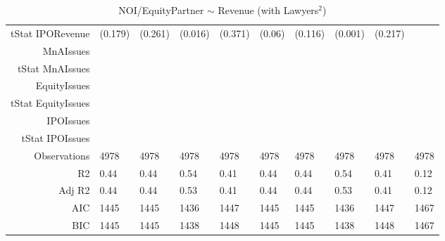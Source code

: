 \begin{table}[ht]
\begin{tabular}{rlllllllll}
  tStat IPORevenue & (0.179) & (0.261) & (0.016) & (0.371) & (0.06) & (0.116) & (0.001) & (0.217) &  \\ 
  MnAIssues &  &  &  &  &  &  &  &  &  \\ 
  tStat MnAIssues &  &  &  &  &  &  &  &  &  \\ 
  EquityIssues &  &  &  &  &  &  &  &  &  \\ 
  tStat EquityIssues &  &  &  &  &  &  &  &  &  \\ 
  IPOIssues &  &  &  &  &  &  &  &  &  \\ 
  tStat IPOIssues &  &  &  &  &  &  &  &  &  \\ 
  Observations & 4978 & 4978 & 4978 & 4978 & 4978 & 4978 & 4978 & 4978 & 4978 \\ 
  R2 & 0.44 & 0.44 & 0.54 & 0.41 & 0.44 & 0.44 & 0.54 & 0.41 & 0.12 \\ 
  Adj R2 & 0.44 & 0.44 & 0.53 & 0.41 & 0.44 & 0.44 & 0.53 & 0.41 & 0.12 \\ 
  AIC & 1445 & 1445 & 1436 & 1447 & 1445 & 1445 & 1436 & 1447 & 1467 \\ 
  BIC & 1445 & 1445 & 1438 & 1448 & 1445 & 1445 & 1438 & 1448 & 1467 \\ 
   \hline
\end{tabular}
\caption{NOI/EquityPartner $\sim$ Revenue (with Lawyers$^2$)} 
\end{table}
